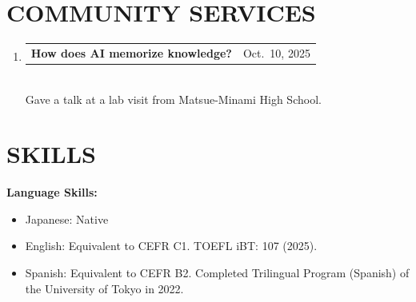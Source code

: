 \documentclass[11pt,a4paper]{article}
\makeatletter
\newcommand{\entry}[2]{%
  \noindent\begin{tabularx}{\linewidth}{@{}Xr@{}}#1 & #2\end{tabularx}%
}
\makeatother
\begin{document}
\section{COMMUNITY SERVICES}

\begin{enumerate}[leftmargin=2em]
	\item \entry{\textbf{How does AI memorize knowledge?}}{Oct.\ 10, 2025}\\
	      Gave a talk at a lab visit from Matsue-Minami High School.
\end{enumerate}

\section{SKILLS}

\noindent\textbf{Language Skills:}
\begin{itemize}
	\item Japanese: Native
	\item English: Equivalent to CEFR C1. TOEFL iBT: 107 (2025).
	\item Spanish: Equivalent to CEFR B2. Completed Trilingual Program (Spanish) of the University of Tokyo in 2022.
\end{itemize}
\end{document}
